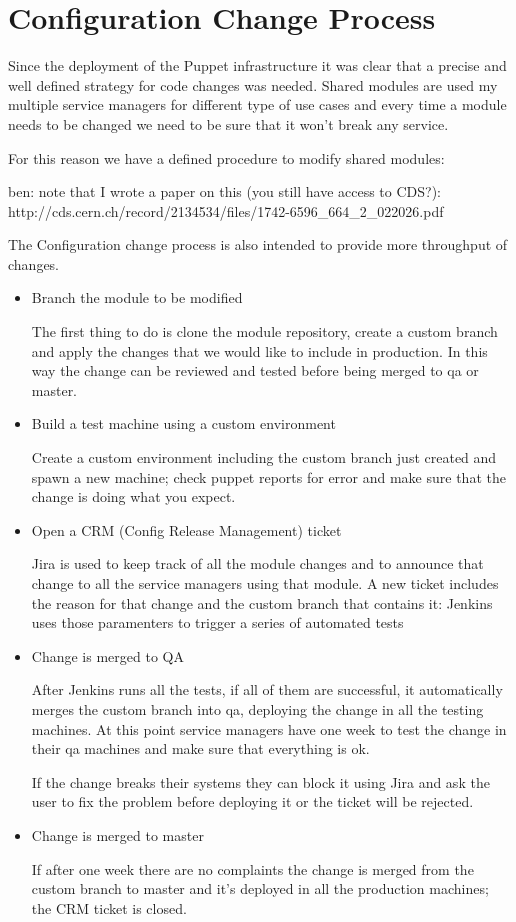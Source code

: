\section{Configuration Change Process}

Since the deployment of the Puppet infrastructure it was clear that
a precise and well defined strategy for code changes was needed. Shared
modules are used my multiple service managers for different type of use
cases and every time a module needs to be changed we need to be sure that
it won't break any service.

For this reason we have a defined procedure to modify shared modules:

ben: note that I wrote a paper on this (you still have access to CDS?):
http://cds.cern.ch/record/2134534/files/1742-6596_664_2_022026.pdf

The Configuration change process is also intended to provide more 
throughput of changes.

\begin{itemize}

\item Branch the module to be modified

The first thing to do is clone the module repository, create a custom
branch and apply the changes that we would like to include in production.
In this way the change can be reviewed and tested before being merged to
qa or master.

\item Build a test machine using a custom environment

Create a custom environment including the custom branch just created and spawn
a new machine; check puppet reports for error and make sure that the change is
doing what you expect.

\item Open a CRM (Config Release Management) ticket

Jira is used to keep track of all the module changes and to announce that
change to all the service managers using that module. A new ticket includes the
reason for that change and the custom branch that contains it: Jenkins uses
those paramenters to trigger a series of automated tests

\item Change is merged to QA

After Jenkins runs all the tests, if all of them are successful, it
automatically merges the custom branch into qa, deploying the change in all the
testing machines. At this point service managers have one week to test the
change in their qa machines and make sure that everything is ok.

If the change breaks their systems they can block it using Jira and ask the
user to fix the problem before deploying it or the ticket will be rejected.

\item Change is merged to master

If after one week there are no complaints the change is merged from the custom
branch to master and it's deployed in all the production machines; the CRM
ticket is closed.

\end{itemize}

